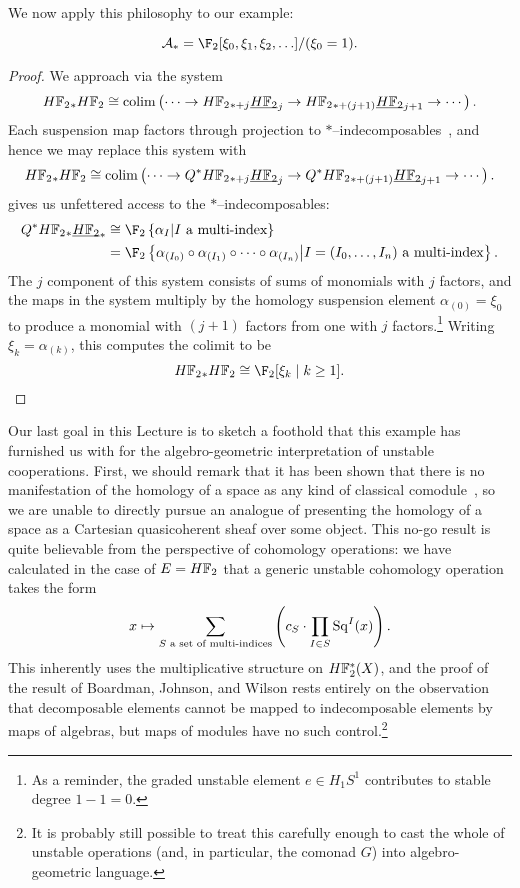 We now apply this philosophy to our example:
\begin{corollary}\label{StarIndecompsInUDualSteenrodAlg}
\[\mathcal A_* = \F_2[\xi_0, \xi_1, \xi_2, \ldots]/(\xi_0 = 1).\]
\end{corollary}
\begin{proof}
We approach via the system \[\HFtwo_* \HFtwo \cong \colim\left( \cdots \to \HFtwo_{*+j} \OS{\HFtwo}{j} \to \HFtwo_{*+(j+1)} \OS{\HFtwo}{j+1} \to \cdots \right).\]  Each suspension map factors through projection to \(\ast\)--indecomposables~\cite[Corollary 2.18]{BJW}, and hence we may replace this system with \[\HFtwo_* \HFtwo \cong \colim\left( \cdots \to Q^* \HFtwo_{*+j} \OS{\HFtwo}{j} \to Q^* \HFtwo_{*+(j+1)} \OS{\HFtwo}{j+1} \to \cdots \right).\]   gives us unfettered access to the \(\ast\)--indecomposables:
\begin{align*}
Q^\ast \HFtwo_* \OS{\HFtwo}{*} & \cong \F_2\left\{\alpha_{I} \middle| \text{\(I\) a multi-index}\right\} \\
& = \F_2\left\{ \alpha_{(I_0)} \circ \alpha_{(I_1)} \circ \cdots \circ \alpha_{(I_n)} \middle| \text{\(I = (I_0, \ldots, I_n)\) a multi-index}\right\}.
\end{align*}
The \(j\){\th} component of this system consists of sums of monomials with \(j\) factors, and the maps in the system multiply by the homology suspension element \(\alpha_{(0)} = \xi_0\) to produce a monomial with \((j+1)\) factors from one with \(j\) factors.\footnote{As a reminder, the graded unstable element \(e \in H_1 S^1\) contributes to stable degree \(1 - 1 = 0\).}  Writing \(\xi_k = \alpha_{(k)}\), this computes the colimit to be \[\HFtwo_* \HFtwo \cong \F_2[\xi_k \mid k \ge 1]. \qedhere\]
\end{proof}

Our last goal in this Lecture is to sketch a foothold that this example has furnished us with for the algebro-geometric interpretation of unstable cooperations.  First, we should remark that it has been shown that there is no manifestation of the homology of a space as any kind of classical comodule~\cite[Theorem 9.4]{BJW}, so we are unable to directly pursue an analogue of  presenting the homology of a space as a Cartesian quasicoherent sheaf over some object.  This no-go result is quite believable from the perspective of cohomology operations: we have calculated in the case of \(E = \HFtwo\) that a generic unstable cohomology operation takes the form \[x \mapsto \sum_{\text{\(S\) a set of multi-indices}} \left(c_S \cdot \prod_{I \in S} \operatorname{Sq}^I(x)\right).\]  This inherently uses the multiplicative structure on \(\HFtwo^*(X)\), and the proof of the result of Boardman, Johnson, and Wilson rests entirely on the observation that decomposable elements cannot be mapped to indecomposable elements by maps of algebras, but maps of modules have no such control.\footnote{It is probably still possible to treat this carefully enough to cast the whole of unstable operations (and, in particular, the comonad \(G\)) into algebro-geometric language.}


